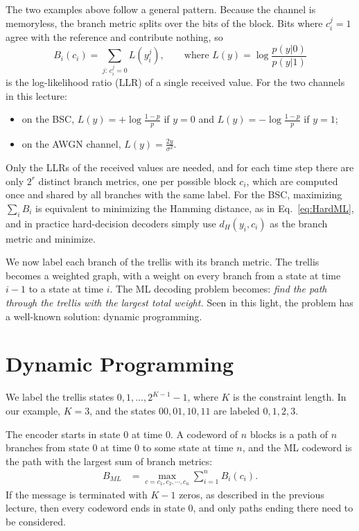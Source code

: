 The two examples above follow a general pattern. Because the channel is memoryless, the branch metric splits over the bits of the block. Bits where \(c_i^j = 1\) agree with the reference and contribute nothing, so
\begin{equation}
B_i(c_i) = \sum_{j:\, c_i^j = 0} L(y_i^j), \qquad \text{where } L(y) = \log\frac{p(y|0)}{p(y|1)} \label{eq:BranchLLR}
\end{equation}
is the log-likelihood ratio (LLR) of a single received value. For the two channels in this lecture:
\begin{itemize}
    \item on the BSC, \(L(y) = +\log\frac{1-p}{p}\) if \(y = 0\) and \(L(y) = -\log\frac{1-p}{p}\) if \(y = 1\);
    \item on the AWGN channel, \(L(y) = \frac{2y}{\sigma^2}\).
\end{itemize}
Only the LLRs of the received values are needed, and for each time step there are only \(2^r\) distinct branch metrics, one per possible block \(c_i\), which are computed once and shared by all branches with the same label. For the BSC, maximizing \(\sum_i B_i\) is equivalent to minimizing the Hamming distance, as in Eq.~\ref{eq:HardML}, and in practice hard-decision decoders simply use \(d_H(y_i, c_i)\) as the branch metric and minimize.

We now label each branch of the trellis with its branch metric. The trellis becomes a weighted graph, with a weight on every branch from a state at time \(i-1\) to a state at time \(i\). The ML decoding problem becomes: \emph{find the path through the trellis with the largest total weight.} Seen in this light, the problem has a well-known solution: dynamic programming.

\section{Dynamic Programming}\label{sec:dp}
We label the trellis states \(0, 1, \ldots, 2^{K-1}-1\), where \(K\) is the constraint length. In our example, \(K=3\), and the states \(00, 01, 10, 11\) are labeled \(0, 1, 2, 3\).

The encoder starts in state \(0\) at time \(0\). A codeword of \(n\) blocks is a path of \(n\) branches from state \(0\) at time \(0\) to some state at time \(n\), and the ML codeword is the path with the largest sum of branch metrics:
\begin{align}
    B_{ML} &=\max_{c=c_1, c_2, \cdots, c_n} \sum_{i=1}^{n} B_i(c_i). \label{eq:BML}
\end{align}
If the message is terminated with \(K-1\) zeros, as described in the previous lecture, then every codeword ends in state \(0\), and only paths ending there need to be considered.


